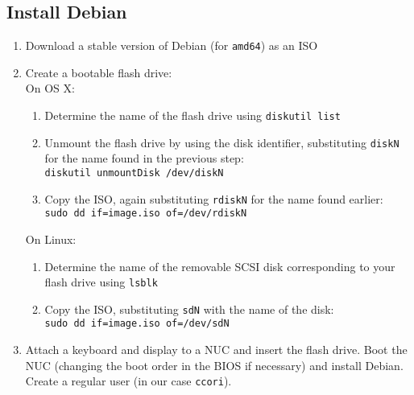 \documentclass{article}
\begin{document}
    \subsection{Install Debian}
    \begin{enumerate}
        \item Download a stable version of Debian (for \texttt{amd64}) as an ISO
        \item Create a bootable flash drive:\\
            On OS X:
            \begin{enumerate}
                \item Determine the name of the flash drive using
                    \texttt{diskutil list}
                \item Unmount the flash drive by using the disk identifier,
                    substituting \texttt{diskN} for the name found in the
                    previous step:\\
                    \texttt{diskutil unmountDisk /dev/diskN}
                \item Copy the ISO, again substituting \texttt{rdiskN} for the
                    name found earlier:\\
                    \texttt{sudo dd if=image.iso of=/dev/rdiskN}
            \end{enumerate}
            On Linux:
            \begin{enumerate}
                \item Determine the name of the removable SCSI disk
                    corresponding to your flash drive using
                    \texttt{lsblk}
                \item Copy the ISO, substituting \texttt{sdN} with the name of
                    the disk:\\
                    \texttt{sudo dd if=image.iso of=/dev/sdN}
            \end{enumerate}
        \item Attach a keyboard and display to a NUC and insert the flash drive.
            Boot the NUC (changing the boot order in the BIOS if necessary) and
            install Debian.  Create a regular user (in our case
            \texttt{ccori}).
    \end{enumerate}
\end{document}

